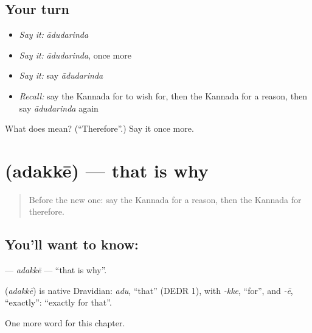 \subsection*{Your turn}
\begin{itemize}
\raggedright
  \item \emph{Say it:} \emph{ādudarinda}
  \item \emph{Say it:} \emph{ādudarinda}, once more
  \item \emph{Say it:} say \emph{ādudarinda}
  \item \emph{Recall:} say the Kannada for to wish for, then the Kannada for a reason, then say \emph{ādudarinda} again
\end{itemize}

\begin{tcolorbox}[breakable,colback=teal!4,colframe=teal!35!black,title={Before you move on}]
What does  mean? (\textquotedblleft{}Therefore\textquotedblright{}.) Say it once more.
\end{tcolorbox}
\section[\texorpdfstring{\kn{ಅದಕ್ಕೇ} (adakkē)}{ಅದಕ್ಕೇ (adakkē)}]{ (adakkē) — that is why}

\label{lesson:KA-C115-adakke}



\begin{quote}
Before the new one: say the Kannada for a reason, then the Kannada for therefore.
\end{quote}

\subsection*{You'll want to know: }
\textbf{} — \emph{adakkē} — \textquotedblleft{}that is why\textquotedblright{}.

\begin{cousinweb}
\textbf{} (\emph{adakkē}) is native Dravidian: \emph{adu}, \textquotedblleft{}that\textquotedblright{} (DEDR 1), with \emph{-kke}, \textquotedblleft{}for\textquotedblright{}, and \emph{-ē}, \textquotedblleft{}exactly\textquotedblright{}: \textquotedblleft{}exactly for that\textquotedblright{}.
\end{cousinweb}

\begin{grammarlens}[title={What you've built}]
One more word for this chapter.
\end{grammarlens}

